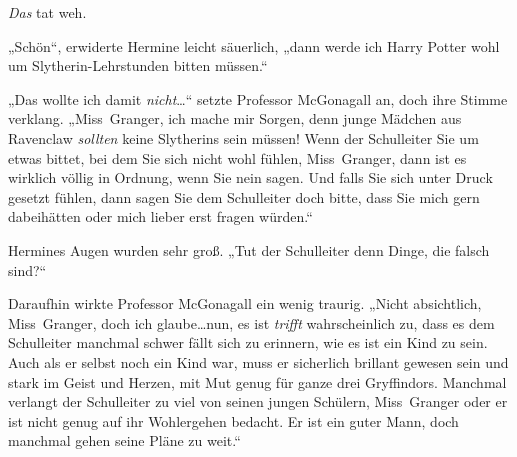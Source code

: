 \emph{Das} tat weh.

„Schön“, erwiderte Hermine leicht säuerlich, „dann werde ich Harry Potter wohl um Slytherin-Lehrstunden bitten müssen.“

„Das wollte ich damit \emph{nicht}…“ setzte Professor McGonagall an, doch ihre Stimme verklang.
„Miss~Granger, ich mache mir Sorgen, denn junge Mädchen aus Ravenclaw \emph{sollten} keine Slytherins sein müssen! Wenn der Schulleiter Sie um etwas bittet, bei dem Sie sich nicht wohl fühlen, Miss~Granger, dann ist es wirklich völlig in Ordnung, wenn Sie nein sagen. Und falls Sie sich unter Druck gesetzt fühlen, dann sagen Sie dem Schulleiter doch bitte, dass Sie mich gern dabeihätten oder mich lieber erst fragen würden.“

Hermines Augen wurden sehr groß.
„Tut der Schulleiter denn Dinge, die falsch sind?“

Daraufhin wirkte Professor McGonagall ein wenig traurig.
„Nicht absichtlich, Miss~Granger, doch ich glaube…nun, es ist \emph{trifft} wahrscheinlich zu, dass es dem Schulleiter manchmal schwer fällt sich zu erinnern, wie es ist ein Kind zu sein. Auch als er selbst noch ein Kind war, muss er sicherlich brillant gewesen sein und stark im Geist und Herzen, mit Mut genug für ganze drei Gryffindors. Manchmal verlangt der Schulleiter zu viel von seinen jungen Schülern, Miss~Granger oder er ist nicht genug auf ihr Wohlergehen bedacht. Er ist ein guter Mann, doch manchmal gehen seine Pläne zu weit.“

